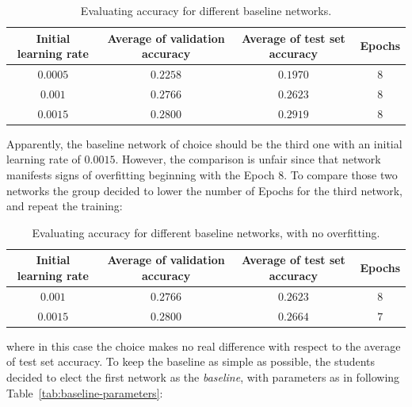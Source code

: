 \documentclass[a4paper, 11pt]{article} %
\begin{document}
\bigskip

\begin{table}[ht]
\centering
\begin{tabular}{|c|c|c|c|}
\hline 
\textbf{Initial learning rate} & \textbf{Average of validation accuracy} & \textbf{Average of test set accuracy} & \textbf{Epochs} \\
\hline \hline 
$0.0005$ & $0.2258$ & $0.1970$ & $8$ \\
\hline
$0.001$ & $0.2766$ & $0.2623$ & $8$ \\
\hline 
$0.0015$ & $0.2800$ & $0.2919$ & $8$ \\
\hline
\end{tabular}
\caption{Evaluating accuracy for different baseline networks.}\label{tab:baseline-accuracy}
\end{table}
\bigskip

Apparently, the baseline network of choice should be the third one with an initial learning rate of $0.0015$. However, the comparison is unfair since that network manifests signs of overfitting beginning with the Epoch $8$. To compare those two networks the group decided to lower the number of Epochs for the third network, and repeat the training:

\bigskip

\begin{table}[ht]
\centering
\begin{tabular}{|c|c|c|c|}
\hline 
\textbf{Initial learning rate} & \textbf{Average of validation accuracy} & \textbf{Average of test set accuracy} & \textbf{Epochs} \\
\hline \hline 
$0.001$ & $0.2766$ & $0.2623$ & $8$\\
\hline 
$0.0015$ & $0.2800$ & $0.2664$ & $7$\\
\hline
\end{tabular}
\caption{Evaluating accuracy for different baseline networks, with no overfitting.}\label{tab:baseline-accuracy-no-overfitting}
\end{table}
\bigskip

where in this case the choice makes no real difference with respect to the average of test set accuracy. To keep the baseline as simple as possible, the students decided to elect the first network as the \emph{baseline}, with parameters as in following Table~\ref{tab:baseline-parameters}:
\end{document}

